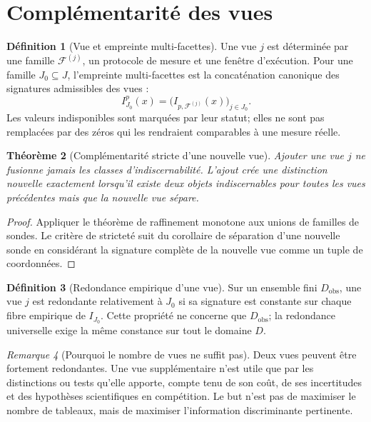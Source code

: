 \documentclass[11pt,oneside]{book}
\newtheorem{theoreme}{Théorème}[chapter]
\theoremstyle{definition}
\newtheorem{definition}[theoreme]{Définition}
\theoremstyle{remark}
\newtheorem{remarque}[theoreme]{Remarque}
\newcommand{\Fcal}{\mathcal F}
\newcommand{\1}{\mathbf 1}
\begin{document}
\section{Complémentarité des vues}
\begin{definition}[Vue et empreinte multi-facettes]
Une vue $j$ est déterminée par une famille $\Fcal^{(j)}$, un protocole de mesure et une fenêtre d'exécution. Pour une famille $J_0\subseteq J$, l'empreinte multi-facettes est la concaténation canonique des signatures admissibles des vues :
\[
I_{J_0}^{p}(x)=\bigl(I_{p,\Fcal^{(j)}}(x)\bigr)_{j\in J_0}.
\]
Les valeurs indisponibles sont marquées par leur statut; elles ne sont pas remplacées par des zéros qui les rendraient comparables à une mesure réelle.
\end{definition}

\begin{theoreme}[Complémentarité stricte d'une nouvelle vue]
Ajouter une vue $j$ ne fusionne jamais les classes d'indiscernabilité. L'ajout crée une distinction nouvelle exactement lorsqu'il existe deux objets indiscernables pour toutes les vues précédentes mais que la nouvelle vue sépare.
\end{theoreme}
\begin{proof}
Appliquer le théorème de raffinement monotone aux unions de familles de sondes. Le critère de stricteté suit du corollaire de séparation d'une nouvelle sonde en considérant la signature complète de la nouvelle vue comme un tuple de coordonnées.
\end{proof}

\begin{definition}[Redondance empirique d'une vue]
Sur un ensemble fini $D_{\mathrm{obs}}$, une vue $j$ est redondante relativement à $J_0$ si sa signature est constante sur chaque fibre empirique de $I_{J_0}$. Cette propriété ne concerne que $D_{\mathrm{obs}}$; la redondance universelle exige la même constance sur tout le domaine $D$.
\end{definition}

\begin{remarque}[Pourquoi le nombre de vues ne suffit pas]
Deux vues peuvent être fortement redondantes. Une vue supplémentaire n'est utile que par les distinctions ou tests qu'elle apporte, compte tenu de son coût, de ses incertitudes et des hypothèses scientifiques en compétition. Le but n'est pas de maximiser le nombre de tableaux, mais de maximiser l'information discriminante pertinente.
\end{remarque}
\end{document}
